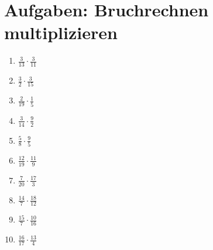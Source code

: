 \documentclass[%
    11pt,paper=a4,fleqn,parskip=half%
]{scrartcl}
\begin{document}
\section*{Aufgaben: Bruchrechnen multiplizieren}
\begin{enumerate} 
  \item $\frac{3}{13} \cdot \frac{3}{11}$ \vspace{1em} 
  \item $\frac{3}{2} \cdot \frac{3}{15}$ \vspace{1em} 
  \item $\frac{2}{19} \cdot \frac{1}{5}$ \vspace{1em} 
  \item $\frac{3}{14} \cdot \frac{9}{2}$ \vspace{1em} 
  \item $\frac{5}{8} \cdot \frac{9}{5}$ \vspace{1em} 
  \item $\frac{12}{19} \cdot \frac{11}{9}$ \vspace{1em} 
  \item $\frac{7}{20} \cdot \frac{17}{3}$ \vspace{1em} 
  \item $\frac{14}{7} \cdot \frac{18}{12}$ \vspace{1em} 
  \item $\frac{15}{7} \cdot \frac{10}{16}$ \vspace{1em} 
  \item $\frac{16}{17} \cdot \frac{13}{4}$ \vspace{1em} 

\end{enumerate} 
%    
\end{document}

